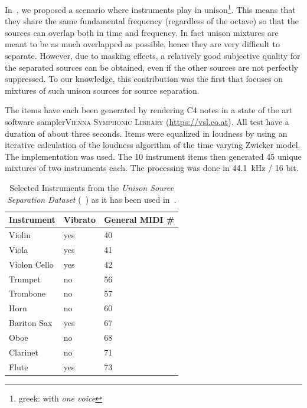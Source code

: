
In~\cite{stoeter14}, we proposed a scenario where instruments play in unison\footnote{greek: with \emph{one voice}}. 
This means that they share the same fundamental frequency (regardless of the octave) so that the sources can overlap both in time and frequency. In fact unison mixtures are meant to be as much overlapped as possible, hence they are very difficult to separate. However, due to masking effects, a relatively good subjective quality for the separated sources can be obtained, even if the other sources are not perfectly suppressed.
To our knowledge, this contribution was the first that focuses on mixtures of such unison sources for source separation.
\par
The items have each been generated by rendering C4 notes in a state of the art software sampler\textsc{Vienna Symphonic Library} (\url{https://vsl.co.at}). All test have a duration of about three seconds. Items were equalized in loudness by using an iterative calculation of the loudness algorithm of the time varying Zwicker model. The implementation \cite{genesis12} was used. The 10 instrument items then generated 45 unique mixtures of two instruments each. The processing was done in 44.1~kHz / 16 bit.

\begin{table}
\begin{center}
\footnotesize
\begin{tabular}{ l l l}
  Instrument & Vibrato &  General MIDI \# \\
  \hline
  Violin & yes & 40 \\
  Viola & yes & 41 \\
  Violon Cello & yes & 42 \\
  Trumpet & no & 56 \\
  Trombone & no & 57\\
  Horn & no & 60  \\
  Bariton Sax & yes & 67 \\ %
  Oboe & no & 68\\
  Clarinet & no & 71\\
  Flute & yes & 73\\
\end{tabular}
\end{center}
\caption{Selected Instruments from the \emph{Unison Source Separation Dataset} (~\cite{oss_unison}) as it has been used in~\cite{stoeter14, stoeter16}.}
\label{tab:testset}
\end{table}

